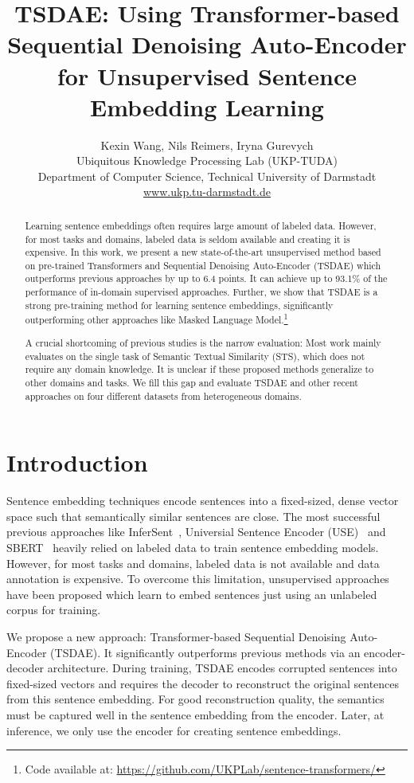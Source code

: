 \documentclass[11pt,a4paper]{article}
\title{TSDAE: Using Transformer-based Sequential Denoising Auto-Encoder for Unsupervised Sentence Embedding Learning}
\author{Kexin Wang, Nils Reimers, Iryna Gurevych \\
	Ubiquitous Knowledge Processing Lab (UKP-TUDA)\\
	Department of Computer Science, Technical University of Darmstadt\\
	\url{www.ukp.tu-darmstadt.de}}
\date{}
\begin{document}
\maketitle
\begin{abstract}
Learning sentence embeddings often requires large amount of labeled data. However, for most tasks and domains, labeled data is seldom available and creating it is expensive. In this work, we present a new state-of-the-art unsupervised method based on pre-trained Transformers and Sequential Denoising Auto-Encoder (TSDAE) which outperforms previous approaches by up to 6.4 points. It can achieve up to 93.1\% of the performance of in-domain supervised approaches. Further, we show that TSDAE is a strong pre-training method for learning sentence embeddings, significantly outperforming other approaches like Masked Language Model.\footnote{Code available at: \url{https://github.com/UKPLab/sentence-transformers/}}

A crucial shortcoming of previous studies is the narrow evaluation: Most work mainly evaluates on the single task of Semantic Textual Similarity (STS), which does not require any domain knowledge. It is unclear if these proposed methods generalize to other domains and tasks. We fill this gap and evaluate TSDAE and other recent approaches on four different datasets from heterogeneous domains.
\end{abstract}

\section{Introduction}
Sentence embedding techniques encode sentences into a fixed-sized, dense vector space such that semantically similar sentences are close. The most successful previous approaches like InferSent~\citep{conneau-EtAl:2017:EMNLP2017}, Universial Sentence Encoder (USE)~\citep{DBLP:conf/emnlp/CerYKHLJCGYTSK18} and SBERT~\citep{DBLP:conf/emnlp/ReimersG19} heavily relied on labeled data to train sentence embedding models. However, for most tasks and domains, labeled data is not available and data annotation is expensive. To overcome this limitation, unsupervised approaches have been proposed which learn to embed sentences just using an unlabeled corpus for training.

We propose a new approach: Transformer-based Sequential Denoising Auto-Encoder (TSDAE). It significantly outperforms previous methods via an encoder-decoder architecture. During training, TSDAE encodes corrupted sentences into fixed-sized vectors and requires the decoder to reconstruct the original sentences from this sentence embedding. For good reconstruction quality, the semantics must be captured well in the sentence embedding from the encoder. Later, at inference, we only use the encoder for creating sentence embeddings.
\end{document}
